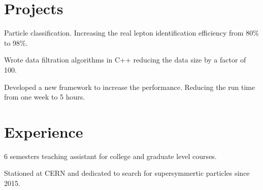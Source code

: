 \documentclass[letterpaper]{deedy-resume-openfont}
\begin{document}
\section{Projects}



\location{}
\begin{tightemize}
\item Particle classification. Increasing the real lepton identification efficiency from 80\% to 98\%.
\item Wrote data filtration algorithms in C++ reducing the data size by a factor of 100.
\item Developed a new framework to increase the performance. Reducing the run time from one week to 5 hours.
\end{tightemize}
\sectionsep


\section{Experience}

\begin{tightemize}
\item 6 semesters teaching assistant for college and graduate level courses.
\item Stationed at CERN and dedicated to search for supersymmertic particles since 2015.
\end{tightemize}
\sectionsep
\end{document}
